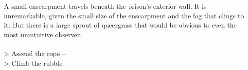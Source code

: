 A small enscarpment travels beneath the prison's exterior wall. It is unremarkable, given the small size of the enscarpment and the fog that clings to it. But there is a large sprout of queergrass that would be obvious to even the most unintuitive observer.\\
\\

> Ascend the rope -- \\
> Climb the rubble -- 